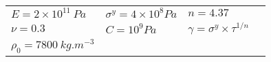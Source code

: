  \begin{tabular}{l|l|lN}
    \hline
    $E=2\times 10^{11}\:Pa$ & $\sigma^y=4 \times 10^8 Pa$ & $n=4.37$&  \\ [3pt]
    $\nu=0.3$ & $C=10^{9} Pa$ & $\gamma=\sigma^y \times \tau^{1/n} $ & \\[3pt]
    $\rho_0 = 7800 \: kg.m^{-3}$ & & &\\[3pt]
    \hline
  \end{tabular}

